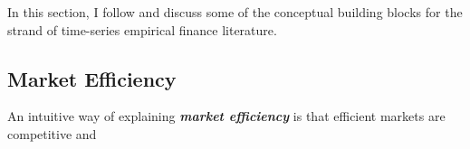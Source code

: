 In this section, I follow \citet[Chapter~5]{campbell2017financial} and discuss some 
of the conceptual building blocks for the strand of time-series empirical finance literature.

\subsection{Market Efficiency}
An intuitive way of explaining \textbf{\textit{market efficiency}} is that efficient markets
are competitive and 
